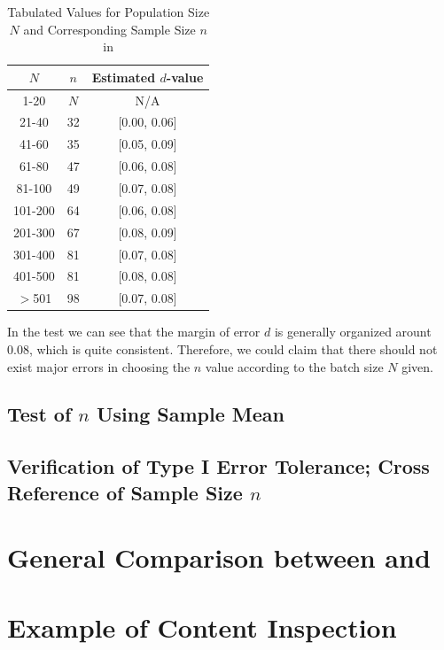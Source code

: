 \documentclass[12pt]{article}
\begin{document}
\begin{table}[htbp]
    \centering
    \begin{tabular}{ccc}
        \toprule
        $N$ & $n$ & Estimated $d$-value \\
        \midrule
        1-20 & $N$ & N/A \\
        21-40 & 32 & [0.00, 0.06] \\
        41-60 & 35 & [0.05, 0.09] \\
        61-80 & 47 & [0.06, 0.08]\\ 
        81-100 & 49 & [0.07, 0.08]\\ 
        101-200 & 64 & [0.06, 0.08]\\ 
        201-300 & 67 & [0.08, 0.09]\\ 
        301-400 & 81 & [0.07, 0.08]\\ 
        401-500 & 81 & [0.08, 0.08]\\ 
        $>$501 & 98 & [0.07, 0.08] \\
        \bottomrule
    \end{tabular}
    \caption{Tabulated Values for Population Size $N$ and Corresponding Sample Size $n$ in \cite{OIML2016}}
\end{table}

In the test we can see that the margin of error $d$ is generally organized arount 0.08, which is quite consistent. Therefore, we could claim that there should not exist major errors in choosing the $n$ value according to the batch size $N$ given. 

\subsection{Test of $n$ Using Sample Mean}



\subsection{Verification of Type I Error Tolerance; Cross Reference of Sample Size $n$}


\section{General Comparison between \cite{JJF2005} and \cite{OIML2016}}

\section{Example of Content Inspection}
\end{document}
